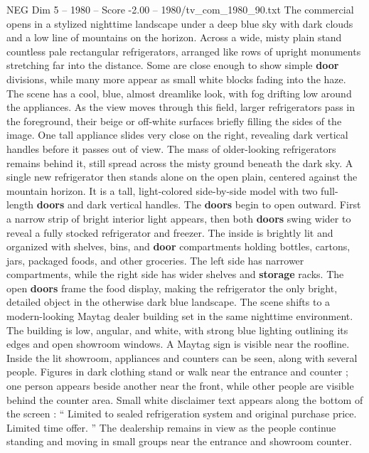 \begin{textsample}{NEG Dim 5 – 1980 – Score -2.00 – 1980/tv\_com\_1980\_90.txt}  \label{ex:f5_neg_063}
The commercial opens in a stylized nighttime landscape under a deep blue sky with dark clouds and a low line of mountains on the horizon.
Across a wide, misty plain stand countless pale rectangular refrigerators, arranged like rows of upright monuments stretching far into the distance.
Some are close enough to show simple \textbf{door} divisions, while many more appear as small white blocks fading into the haze.
The scene has a cool, blue, almost dreamlike look, with fog drifting low around the appliances.
As the view moves through this field, larger refrigerators pass in the foreground, their beige or off-white surfaces briefly filling the sides of the image.
One tall appliance slides very close on the right, revealing dark vertical handles before it passes out of view.
The mass of older-looking refrigerators remains behind it, still spread across the misty ground beneath the dark sky.
A single new refrigerator then stands alone on the open plain, centered against the mountain horizon.
It is a tall, light-colored side-by-side model with two full-length \textbf{doors} and dark vertical handles.
The \textbf{doors} begin to open outward.
First a narrow strip of bright interior light appears, then both \textbf{doors} swing wider to reveal a fully stocked refrigerator and freezer.
The inside is brightly lit and organized with shelves, bins, and \textbf{door} compartments holding bottles, cartons, jars, packaged foods, and other groceries.
The left side has narrower compartments, while the right side has wider shelves and \textbf{storage} racks.
The open \textbf{doors} frame the food display, making the refrigerator the only bright, detailed object in the otherwise dark blue landscape.
The scene shifts to a modern-looking Maytag dealer building set in the same nighttime environment.
The building is low, angular, and white, with strong blue lighting outlining its edges and open showroom windows.
A Maytag sign is visible near the roofline.
Inside the lit showroom, appliances and counters can be seen, along with several people.
Figures in dark clothing stand or walk near the entrance and counter ; one person appears beside another near the front, while other people are visible behind the counter area.
Small white disclaimer text appears along the bottom of the screen : “ Limited to sealed refrigeration system and original purchase price.
Limited time offer. ” The dealership remains in view as the people continue standing and moving in small groups near the entrance and showroom counter.

\end{textsample}

